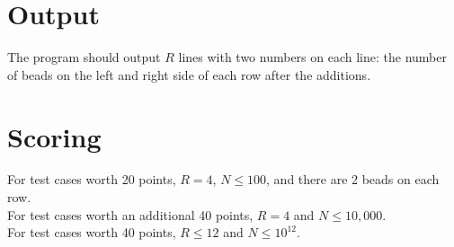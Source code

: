 \section*{Output} 

The program should output $R$ lines with two numbers on
each line: the number of beads on the left and right side of each row
after the additions.

\section*{Scoring}

For test cases worth 20 points, $R=4$, $N\le 100$, and there are 2 beads
on each row.\\
For test cases worth an additional 40 points, $R=4$ and $N\le 10{,}000$.\\
For test cases worth 40 points, $R\le 12$ and $N\le 10^{12}$.
